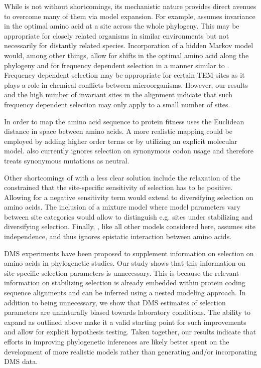\documentclass[fleqn,letterpaper]{article}
\begin{document}
While \selac is not without shortcomings, its mechanistic nature provides direct avenues to overcome many of them via model expansion.
For example, \selac assumes invariance in the optimal amino acid at a site across the whole phylogeny.
This may be appropriate for closely related organisms in similar environments but not necessarily for distantly related species.
Incorporation of a hidden Markov model would, among other things, allow for shifts in the optimal amino acid along the phylogeny and for frequency dependent selection in a manner similar to \gy.
Frequency dependent selection may be appropriate for certain TEM sites as it plays a role in chemical conflicts between microorganisms.
However, our results and the high number of invariant sites in the alignment indicate that such frequency dependent selection may only apply to a small number of sites.

In order to map the amino acid sequence to protein fitness \selac uses the Euclidean distance in \PC space between amino acids. 
A more realistic mapping could be employed by adding higher order terms or by utilizing an explicit molecular model.
\selac also currently ignores selection on synonymous codon usage and therefore treats synonymous mutations as neutral.

Other shortcomings of \selac with a less clear solution include the relaxation of the constrained that the site-specific sensitivity of selection has to be positive.
Allowing for a negative sensitivity term would extend \selac to diversifying selection on amino acids.
The inclusion of a mixture model where model parameters vary between site categories would allow to distinguish e.g. sites under stabilizing and diversifying selection.
Finally, \selac, like all other models considered here, assumes site independence, and thus ignores epistatic interaction between amino acids.

DMS experiments have been proposed to supplement information on selection on amino acids in phylogenetic studies.
Our study shows that this information on site-specific selection parameters is unnecessary.
This is because the relevant information on stabilizing selection is already embedded within protein coding sequence alignments and can be inferred using a nested modeling approach.
In addition to being unnecessary, we show that DMS estimates of selection parameters are unnaturally biased towards laboratory conditions.
The ability to expand \selac as outlined above make it a valid starting point for such improvements and allow for explicit hypothesis testing.
Taken together, our results indicate that efforts in improving phylogenetic inferences are likely better spent on the development of more realistic models rather than generating and/or incorporating DMS data.
\end{document}
